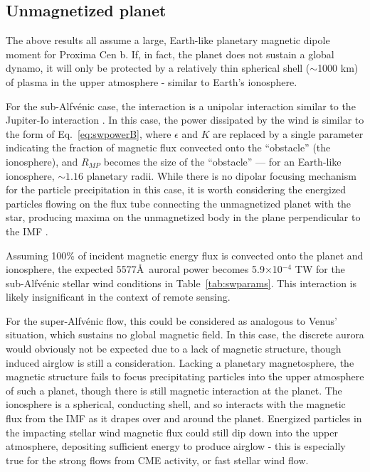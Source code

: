 \documentclass{emulateapj}
\begin{document}
\subsection{Unmagnetized planet}
\label{sec:unmagnetized}

The above results all assume a large, Earth-like planetary magnetic dipole moment for Proxima Cen b. If, in fact, the planet does not sustain a global dynamo, it will only be protected by a relatively thin spherical shell ($\sim$1000 km) of plasma in the upper atmosphere - similar to Earth's ionosphere.

For the sub-Alfv\'{e}nic case, the interaction is a unipolar interaction similar to the Jupiter-Io interaction \citep{Zarka2007}. In this case, the power dissipated by the wind is similar to the form of Eq.~\ref{eq:swpowerB}, where $\epsilon$ and $K$ are replaced by a single parameter indicating the fraction of magnetic flux convected onto the ``obstacle'' (the ionosphere), and $R_{MP}$ becomes the size of the ``obstacle'' --- for an Earth-like ionosphere, ${\sim}1.16$ planetary radii. While there is no dipolar focusing mechanism for the particle precipitation in this case, it is worth considering the energized particles flowing on the flux tube connecting the unmagnetized planet with the star, producing maxima on the unmagnetized body in the plane perpendicular to the IMF \citep[see, e.g.,][]{Saur2000,Saur2004}.

Assuming 100\% of incident magnetic energy flux is convected onto the planet and ionosphere, the expected 5577\AA\ auroral power becomes 5.9$\times$10$^{-4}$ TW for the sub-Alfv\'{e}nic stellar wind conditions in Table~\ref{tab:swparams}. This interaction is likely insignificant in the context of remote sensing.

For the super-Alfv\'{e}nic flow, this could be considered as analogous to Venus' situation, which sustains no global magnetic field. In this case, the discrete aurora would obviously not be expected due to a lack of magnetic structure, though induced airglow is still a consideration. Lacking a planetary magnetosphere, the magnetic structure fails to focus precipitating particles into the upper atmosphere of such a planet, though there is still magnetic interaction at the planet. The ionosphere is a spherical, conducting shell, and so interacts with the magnetic flux from the IMF as it drapes over and around the planet. Energized particles in the impacting stellar wind magnetic flux could still dip down into the upper atmosphere, depositing sufficient energy to produce airglow - this is especially true for the strong flows from CME activity, or fast stellar wind flow.
\end{document}
